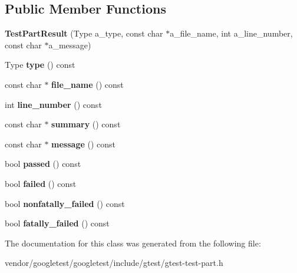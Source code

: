 \subsection*{Public Member Functions}
\begin{DoxyCompactItemize}
\item 
{\bfseries Test\+Part\+Result} (Type a\+\_\+type, const char $\ast$a\+\_\+file\+\_\+name, int a\+\_\+line\+\_\+number, const char $\ast$a\+\_\+message)\hypertarget{classtesting_1_1TestPartResult_a6409eb519c1cd514aab2426c8f40737f}{}\label{classtesting_1_1TestPartResult_a6409eb519c1cd514aab2426c8f40737f}

\item 
Type {\bfseries type} () const \hypertarget{classtesting_1_1TestPartResult_ae852bf8693f066078c74c34345531940}{}\label{classtesting_1_1TestPartResult_ae852bf8693f066078c74c34345531940}

\item 
const char $\ast$ {\bfseries file\+\_\+name} () const \hypertarget{classtesting_1_1TestPartResult_a5d8742dc28ddb880cd2391edb9fc2c9b}{}\label{classtesting_1_1TestPartResult_a5d8742dc28ddb880cd2391edb9fc2c9b}

\item 
int {\bfseries line\+\_\+number} () const \hypertarget{classtesting_1_1TestPartResult_a174900cf4403d23784af34f50e7b0a46}{}\label{classtesting_1_1TestPartResult_a174900cf4403d23784af34f50e7b0a46}

\item 
const char $\ast$ {\bfseries summary} () const \hypertarget{classtesting_1_1TestPartResult_af0d4f960b453ce087c581fe13817b2a3}{}\label{classtesting_1_1TestPartResult_af0d4f960b453ce087c581fe13817b2a3}

\item 
const char $\ast$ {\bfseries message} () const \hypertarget{classtesting_1_1TestPartResult_aae73962246be4d200e2c1d04246a708a}{}\label{classtesting_1_1TestPartResult_aae73962246be4d200e2c1d04246a708a}

\item 
bool {\bfseries passed} () const \hypertarget{classtesting_1_1TestPartResult_a901bd62d9fbe7f39826a9d02ab2bdaec}{}\label{classtesting_1_1TestPartResult_a901bd62d9fbe7f39826a9d02ab2bdaec}

\item 
bool {\bfseries failed} () const \hypertarget{classtesting_1_1TestPartResult_aaf835515fb53eb1aa01c1798b05e61f6}{}\label{classtesting_1_1TestPartResult_aaf835515fb53eb1aa01c1798b05e61f6}

\item 
bool {\bfseries nonfatally\+\_\+failed} () const \hypertarget{classtesting_1_1TestPartResult_a7bb08c87fbc1664f9fcca1504339ed29}{}\label{classtesting_1_1TestPartResult_a7bb08c87fbc1664f9fcca1504339ed29}

\item 
bool {\bfseries fatally\+\_\+failed} () const \hypertarget{classtesting_1_1TestPartResult_a34d31718b5fc6c06f73d03e8dbb1aa9e}{}\label{classtesting_1_1TestPartResult_a34d31718b5fc6c06f73d03e8dbb1aa9e}

\end{DoxyCompactItemize}


The documentation for this class was generated from the following file\+:\begin{DoxyCompactItemize}
\item 
vendor/googletest/googletest/include/gtest/gtest-\/test-\/part.\+h\end{DoxyCompactItemize}
